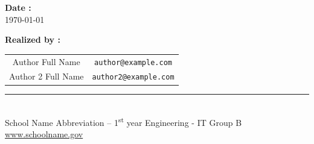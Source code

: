 \begin{titlepage}
\begin{minipage}{0.45\textwidth}
    \vspace{1cm}
    
    \textbf{Date :}\\
    \today
    \end{minipage}
    
    \vspace{2cm}
    
    \begin{center}
        \Large
        \textbf{Realized by :}
    \end{center}
    
    \begin{center}
        \begin{tabular}{c c}
            {\large Author Full Name} & {\small \texttt{author@example.com}} \\[0.1cm]
            {\large Author 2 Full Name} & {\small \texttt{author2@example.com}} \\
        \end{tabular}
    \end{center}

    \vfill

    \begin{center}
        \rule{0.6\textwidth}{0.5pt}\\
        \vspace{0.3cm}
        {\small School Name Abbreviation -- 1\textsuperscript{st} year Engineering - IT Group B}\\[0.1cm]
        {\footnotesize \href{http://www.schoolname.gov/}{www.schoolname.gov}}
    \end{center}

\end{titlepage}
